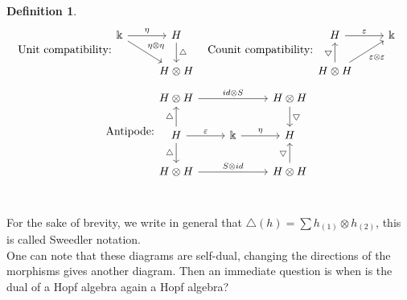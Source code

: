 \documentclass[12pt,a4paper]{article}
\newtheorem{definition}[theorem]{Definition}
\newcommand{\kk}{\Bbbk}
\newcommand\1{_{(1)}}
\newcommand\2{_{(2)}}
\begin{document}
\begin{definition}
\[\text{Unit compatibility:}\begin{tikzcd}
\kk \arrow[rd, "\eta\otimes\eta"] \arrow[r, "\eta"] & H \arrow[d, "\triangle"] \\
                                                    & H\otimes H              
\end{tikzcd}
\text{\;\;\;Counit compatibility:}
\begin{tikzcd}
H \arrow[r, "\varepsilon"]                                                         & \kk \\
H\otimes H \arrow[u, "\bigtriangledown"] \arrow[ru, "\varepsilon\otimes\varepsilon"'] &    
\end{tikzcd}
\]
\[
\text{Antipode:}
\begin{tikzcd}
H\otimes H \arrow[rr, "id\otimes S"]                                      &                       & H\otimes H \arrow[d, "\bigtriangledown"] \\
H \arrow[u, "\triangle"] \arrow[d, "\triangle"'] \arrow[r, "\varepsilon"] & \kk \arrow[r, "\eta"] & H                                     \\
H\otimes H \arrow[rr, "S\otimes id"]                                      &                       & H\otimes H \arrow[u, "\bigtriangledown"]
\end{tikzcd}
\]\\
\end{definition}

For the sake of brevity, we write in general that $\triangle(h)=\sum h\1\otimes h\2$, this is called Sweedler notation.\\

One can note that these diagrams are self-dual, changing the directions of the morphisms gives another diagram. 
Then an immediate question is when is the dual of a Hopf algebra again a Hopf algebra?
\end{document}
